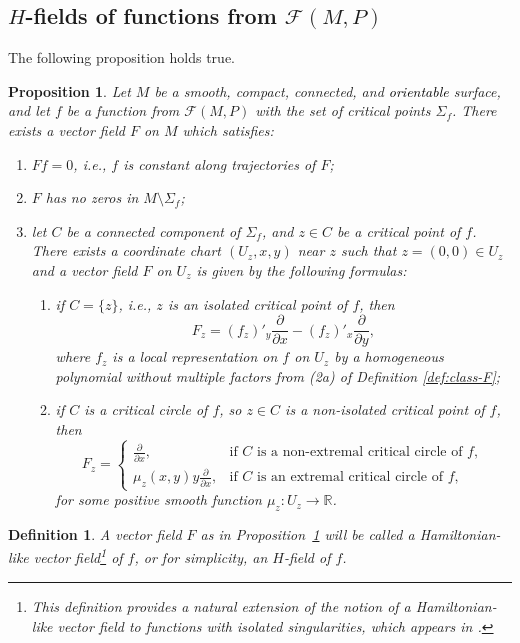 \documentclass[10pt,reqno]{amsart}
\newtheorem{proposition}[subsection]{Proposition}
\newtheorem{definition}[subsection]{Definition}
\newcommand{\bbR}{\mathbb{R}}
\newcommand{\F}{\mathcal{F}(M,P)}
\newcommand{\Crit}{\Sigma_f}
\newcommand{\textr}[1]{\textcolor{black}{#1}}
\begin{document}
\subsection{$H$-fields of  functions from $\F$} \label{ssec:H-like}
The following proposition holds true.
\begin{proposition}\label{prop:vector-field-f}
Let $M$ be a smooth,  compact, connected, and \textr{orientable} surface, and let  $f$ be a function from $\F$ with the set of critical points $\Crit$. There exists a vector field $F$ on $M$ which satisfies:
\begin{enumerate}
	\item $Ff = 0$, i.e., $f$ is constant along trajectories of $F$;
	\item $F$ has no zeros in $M\setminus \Crit$;
	\item let $C$ be a connected component of $\Crit$, and 
	 $z\in C$ be a critical point of $f$. There exists a coordinate chart $(U_z,x,y)$ near $z$ such that $z = (0,0)\in U_z$ and a vector field $F$ on $U_z$ is given by the following formulas:
	\begin{enumerate}[label={\rm(\alph*)}]
		\item if $ C = \{z\}$, i.e.,  $z$ is an isolated critical point of $f$, then 
		\begin{equation}\label{eq:F-neaz-iso-zero}
			F_z = (f_z)'_y\frac{\partial}{\partial x} - (f_z)'_x\frac{\partial}{\partial y},
		\end{equation} 
		where $f_z$ is a local representation on $f$ on $U_z$ by a homogeneous polynomial without multiple factors  from {\rm (2a) of Definition \ref{def:class-F}};
		\item if $C$ is a critical circle of $f$, so $z\in C$ is a non-isolated critical point of $f$, then 
		\begin{equation}\label{eq:F_z-near-C-goal}
			F_z = \begin{cases}
				\frac{\partial}{\partial x}, & \text{if $C$ is a non-extremal critical circle of $f$},\\
				\mu_z(x,y) y \frac{\partial}{\partial x},  &\text{if $C$ is an extremal critical circle of $f$},
			\end{cases}
		\end{equation}
		for some  positive smooth  function $\mu_z:U_z\to \bbR$.
	\end{enumerate}
\end{enumerate}
\end{proposition}
\begin{definition}
A vector field $F$ as in {\rm Proposition~\ref{prop:vector-field-f}} will be called a Hamiltonian-like vector field\footnote{This definition provides a natural extension of the notion of a Hamiltonian-like vector field to functions with isolated singularities, which appears in \cite{Maksymenko:2021:review, Maksymenko:DefFuncI:2014}.}  of $f$, or for simplicity, an {\it$H$-field} of  $f$. 
\end{definition}
\end{document}
